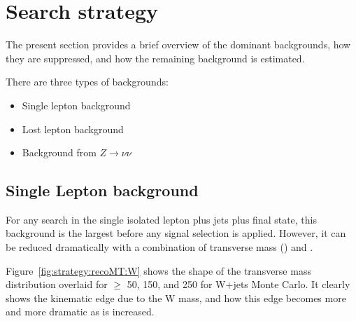 \section{Search strategy}
\label{sec:strategy}

The present section provides a brief overview of the dominant backgrounds, how they are suppressed,
and how the remaining background is estimated.

There are three types of backgrounds:
\begin{itemize}
\item Single lepton background
\item Lost lepton background
\item Background from $Z\to\nu\nu$
\end{itemize}

\subsection{Single Lepton background}

%
For any search in the single isolated lepton plus jets plus \MET final state, this background is the largest before any signal selection is applied. However, it can be reduced dramatically with a combination of transverse mass (\MT) and \MET.

Figure~\ref{fig:strategy:recoMT:W} shows the shape of the transverse mass distribution overlaid for \MET $\ge$ 50, 150, and 250\GeV
for W+jets Monte Carlo. It clearly shows the kinematic edge due to the W mass, and how this edge becomes more and more
dramatic as \MET is increased.

